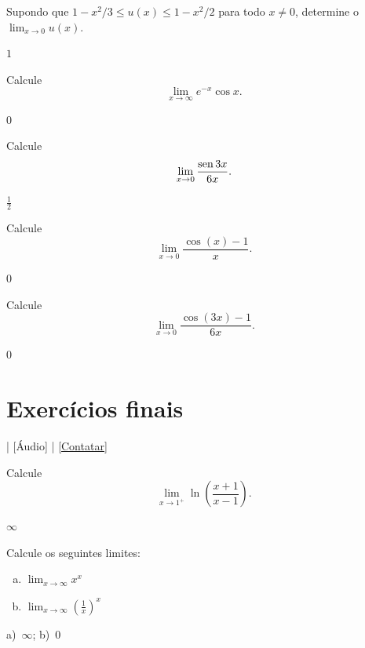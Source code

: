 \begin{exer}
  Supondo que $1-x^2/3 \leq u(x) \leq 1-x^2/2$ para todo $x\neq 0$, determine o $\lim_{x\to 0} u(x)$.
\end{exer}
\begin{resp}
  $1$
\end{resp}

\begin{exer}
  Calcule
  \begin{equation}
    \lim_{x\to \infty} e^{-x}\cos x.
  \end{equation}
\end{exer}
\begin{resp}
  $0$
\end{resp}

\begin{exer}
  Calcule
  \begin{equation}
    \lim_{x\to 0} \frac{\operatorname{sen} 3x}{6x}.
  \end{equation}
\end{exer}
\begin{resp}
  $\frac{1}{2}$
\end{resp}

\begin{exer}\label{exer:lim_cosx_1}
  Calcule
  \begin{equation}
    \lim_{x\to 0} \frac{\cos(x)-1}{x}.
  \end{equation}
\end{exer}
\begin{resp}
  $0$
\end{resp}

\begin{exer}
  Calcule
  \begin{equation}
    \lim_{x\to 0} \frac{\cos(3x)-1}{6x}.
  \end{equation}
\end{exer}
\begin{resp}
  $0$
\end{resp}

\section{Exercícios finais}\label{cap_lim_sec_exfinal}

\begin{flushright}
  [Vídeo] | [Áudio] | \href{https://phkonzen.github.io/notas/contato.html}{[Contatar]}
\end{flushright}

\begin{exer}
  Calcule
  \begin{equation}
    \lim_{x\to 1^+} \ln\left(\frac{x+1}{x-1}\right).
  \end{equation}
\end{exer}
\begin{resp}
  $\infty$
\end{resp}

\begin{exer}
  Calcule os seguintes limites:
  \begin{enumerate}[a)]
  \item $\displaystyle\lim_{x\to\infty} x^x$
  \item $\displaystyle\lim_{x\to\infty} \left(\frac{1}{x}\right)^x$
  \end{enumerate}
\end{exer}
\begin{resp}
  a)~$\infty$; b)~$0$
\end{resp}
